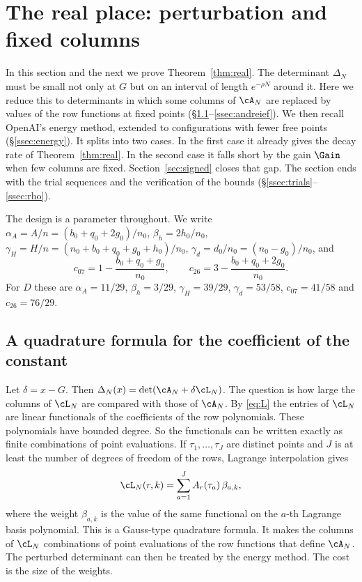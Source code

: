 \section{The real place: perturbation and fixed columns}\label{sec:real}

In this section and the next we prove Theorem~\ref{thm:real}. The determinant $\Delta_N$ must be small
not only at $G$ but on an interval of length $e^{-\rho N}$ around it. Here we reduce this to determinants
in which some columns of $\cA_N$ are replaced by values of the row functions at fixed points
(\S\ref{ssec:quadrature}--\ref{ssec:andreief}). We then recall OpenAI's energy method, extended to
configurations with fewer free points (\S\ref{ssec:energy}). It splits into two cases. In the first case it
already gives the decay rate of Theorem~\ref{thm:real}. In the second case it falls short by the gain
$\Gain$ when few columns are fixed. Section~\ref{sec:signed} closes that gap. The section ends with the
trial sequences and the verification of the bounds (\S\ref{ssec:trials}--\ref{ssec:rho}).

The design is a parameter throughout. We write $\alpha_A=A/n=(b_0+q_0+2g_0)/n_0$, $\beta_h=2h_0/n_0$,
$\gamma_H=H/n=(n_0+b_0+q_0+g_0+h_0)/n_0$, $\gamma_d=d_0/n_0=(n_0-g_0)/n_0$, and
\[
 c_{07}=1-\frac{b_0+q_0+g_0}{n_0},\qquad c_{26}=3-\frac{b_0+q_0+2g_0}{n_0}.
\]
For $D$ these are $\alpha_A=11/29$, $\beta_h=3/29$, $\gamma_H=39/29$, $\gamma_d=53/58$, $c_{07}=41/58$ and
$c_{26}=76/29$.

\subsection{A quadrature formula for the coefficient of the constant}\label{ssec:quadrature}
Let $\delta=x-G$. Then $\Delta_N(x)=\det(\cA_N+\delta\cL_N)$. The question is how large the columns of
$\cL_N$ are compared with those of $\cA_N$. By \eqref{eq:L} the entries of $\cL_N$ are linear functionals of
the coefficients of the row polynomials. These polynomials have bounded degree. So the functionals can be
written exactly as finite combinations of point evaluations. If $\tau_1,\ldots,\tau_J$ are distinct points
and $J$ is at least the number of degrees of freedom of the rows, Lagrange interpolation gives
\begin{equation}\label{eq:quad}
 \cL_N(r,k)=\sum_{a=1}^JA_r(\tau_a)\,\beta_{a,k},
\end{equation}
where the weight $\beta_{a,k}$ is the value of the same functional on the $a$-th Lagrange basis polynomial.
This is a Gauss-type quadrature formula. It makes the columns of $\cL_N$ combinations of point evaluations of
the row functions that define $\cA_N$. The perturbed determinant can then be treated by the energy method.
The cost is the size of the weights.

